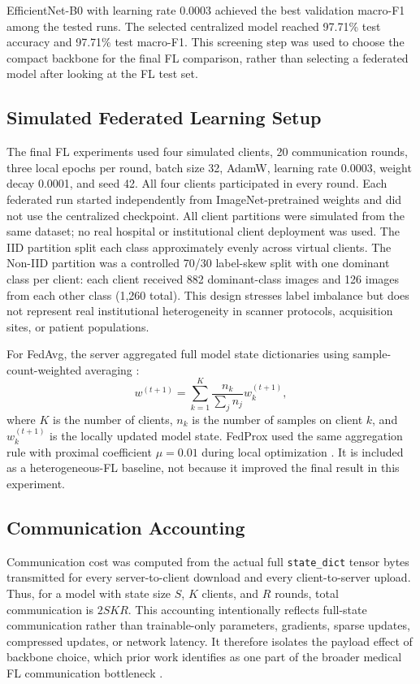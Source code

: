 \documentclass[conference]{IEEEtran}
\begin{document}
EfficientNet-B0 with learning rate 0.0003 achieved the best validation macro-F1 among the tested runs. The selected centralized model reached 97.71\% test accuracy and 97.71\% test macro-F1. This screening step was used to choose the compact backbone for the final FL comparison, rather than selecting a federated model after looking at the FL test set.

\subsection{Simulated Federated Learning Setup}
The final FL experiments used four simulated clients, 20 communication rounds, three local epochs per round, batch size 32, AdamW, learning rate 0.0003, weight decay 0.0001, and seed 42. All four clients participated in every round. Each federated run started independently from ImageNet-pretrained weights and did not use the centralized checkpoint. All client partitions were simulated from the same dataset; no real hospital or institutional client deployment was used. The IID partition split each class approximately evenly across virtual clients. The Non-IID partition was a controlled 70/30 label-skew split with one dominant class per client: each client received 882 dominant-class images and 126 images from each other class (1,260 total). This design stresses label imbalance but does not represent real institutional heterogeneity in scanner protocols, acquisition sites, or patient populations.

For FedAvg, the server aggregated full model state dictionaries using sample-count-weighted averaging \cite{mcmahan2017fedavg}:
\begin{equation}
    w^{(t+1)} = \sum_{k=1}^{K} \frac{n_k}{\sum_j n_j} w_k^{(t+1)},
\end{equation}
where $K$ is the number of clients, $n_k$ is the number of samples on client $k$, and $w_k^{(t+1)}$ is the locally updated model state. FedProx used the same aggregation rule with proximal coefficient $\mu=0.01$ during local optimization \cite{li2020fedprox}. It is included as a heterogeneous-FL baseline, not because it improved the final result in this experiment.

\subsection{Communication Accounting}
Communication cost was computed from the actual full \texttt{state\_dict} tensor bytes transmitted for every server-to-client download and every client-to-server upload. Thus, for a model with state size $S$, $K$ clients, and $R$ rounds, total communication is $2SKR$. This accounting intentionally reflects full-state communication rather than trainable-only parameters, gradients, sparse updates, compressed updates, or network latency. It therefore isolates the payload effect of backbone choice, which prior work identifies as one part of the broader medical FL communication bottleneck \cite{radhika2026communication,zhou2022communication,das2026federated}.
\end{document}
